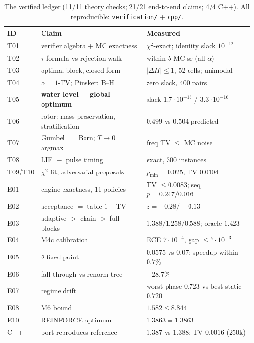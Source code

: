 \documentclass[11pt,a4paper]{article}
\theoremstyle{definition}
\begin{document}
\begin{table}[t]\centering\small
\begin{tabular}{@{}lll@{}}
\toprule
\textbf{ID} & \textbf{Claim} & \textbf{Measured} \\
\midrule
T01 & verifier algebra + MC exactness & $\chi^2$-exact; identity slack $10^{-12}$ \\
T02 & $\tau$ formula vs rejection walk & within 5 MC-se (all $\alpha$) \\
T03 & optimal block, closed form & $|\Delta H|\le1$, 52 cells; unimodal \\
T04 & $\alpha=1$-TV; Pinsker; B--H & zero slack, 400 pairs \\
T05 & \textbf{water level = global optimum} & slack $1.7\cdot10^{-16}$ / $3.3\cdot10^{-16}$ \\
T06 & rotor: mass preservation, stratification & $0.499$ vs $0.504$ predicted \\
T07 & Gumbel $=$ Born; $T\!\to\!0$ argmax & freq TV $\le$ MC noise \\
T08 & LIF $\equiv$ pulse timing & exact, 300 instances \\
T09/T10 & $\chi^2$ fit; adversarial proposals & $p_{\min}=0.025$; TV $0.0104$ \\
E01 & engine exactness, 11 policies & TV $\le0.0083$; seq $p=0.247/0.016$ \\
E02 & acceptance $=$ table $1-$TV & $z=-0.28/-0.13$ \\
E03 & adaptive $>$ chain $>$ full blocks & $1.388/1.258/0.588$; oracle $1.423$ \\
E04 & M4c calibration & ECE $7\cdot10^{-4}$, gap $\le7\cdot10^{-3}$ \\
E05 & $\theta$ fixed point & $0.0575$ vs $0.07$; speedup within $0.7\%$ \\
E06 & fall-through vs renorm tree & $+28.7\%$ \\
E07 & regime drift & worst phase $0.723$ vs best-static $0.720$ \\
E08 & M6 bound & $1.582\le8.844$ \\
E10 & REINFORCE optimum & $1.3863=1.3863$ \\
C++ & port reproduces reference & $1.387$ vs $1.388$; TV $0.0016$ (250k) \\
\bottomrule
\end{tabular}
\caption{The verified ledger (11/11 theory checks; 21/21 end-to-end claims;
4/4 C++). All reproducible: \texttt{verification/} + \texttt{cpp/}.}
\end{table}
\end{document}
